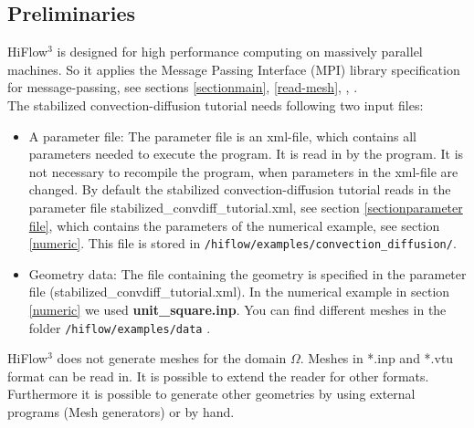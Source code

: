 \documentclass[a4paper, 11pt, twoside]{article}
\begin{document}
\subsection{Preliminaries}
HiFlow$^3$ is designed for high performance computing on massively parallel machines. 
So it applies the Message Passing Interface (MPI) library specification for message-passing, see sections \ref{sectionmain}, \ref{read-mesh}, \cite{MPI}, \cite{MPIstandard} .\\
The stabilized convection-diffusion tutorial needs following two input files:
\begin{itemize}
\item A parameter file: The parameter file is an xml-file, which contains all parameters needed to execute the program. It is read in by the program. It is not necessary to recompile the program, when parameters in the xml-file are changed. By default the stabilized convection-diffusion tutorial reads in the parameter file stabilized\_convdiff\_tutorial.xml, see section \ref{sectionparameter file}, which contains the parameters of the numerical example, see section \ref{numeric}. This file is stored in \verb'/hiflow/examples/convection_diffusion/'.  
\item Geometry data: The file containing the geometry is specified in the parameter file (stabilized\_convdiff\_tutorial.xml). In the numerical example in section \ref{numeric} we used \textbf{unit\_square.inp}. You can find different meshes in the folder \verb'/hiflow/examples/data' .
\end{itemize}

HiFlow$^3$ does not generate meshes for the domain $\Omega$. Meshes in *.inp and *.vtu format can be read in. 
It is possible to extend the reader for other formats.
Furthermore it is possible to generate other geometries by using external programs (Mesh generators) or by hand.\\ 
\end{document}
